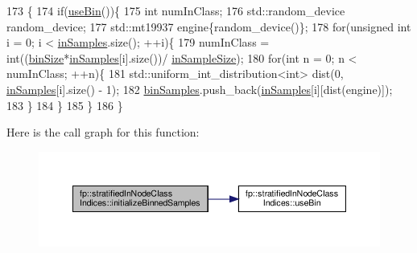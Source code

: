 \begin{DoxyCode}
173                                                  \{
174                 \textcolor{keywordflow}{if}(\hyperlink{classfp_1_1stratifiedInNodeClassIndices_af740a8054cefe977f8f1288fc6b39109}{useBin}())\{
175                     \textcolor{keywordtype}{int} numInClass;
176                     std::random\_device random\_device;
177                     std::mt19937 engine\{random\_device()\};
178                     \textcolor{keywordflow}{for}(\textcolor{keywordtype}{unsigned} \textcolor{keywordtype}{int} i = 0; i < \hyperlink{classfp_1_1stratifiedInNodeClassIndices_a6bfa636c77b48163f5d245959ea753d0}{inSamples}.size(); ++i)\{
179                         numInClass = int((\hyperlink{classfp_1_1stratifiedInNodeClassIndices_aeb008fe5e4d29845a675175590ef2de3}{binSize}*\hyperlink{classfp_1_1stratifiedInNodeClassIndices_a6bfa636c77b48163f5d245959ea753d0}{inSamples}[i].size())/
      \hyperlink{classfp_1_1stratifiedInNodeClassIndices_a2acb617e3212806ae7f994d925bd1468}{inSampleSize});
180                         \textcolor{keywordflow}{for}(\textcolor{keywordtype}{int} n = 0; n < numInClass; ++n)\{
181                             std::uniform\_int\_distribution<int> dist(0, \hyperlink{classfp_1_1stratifiedInNodeClassIndices_a6bfa636c77b48163f5d245959ea753d0}{inSamples}[i].size() - 1);
182                             \hyperlink{classfp_1_1stratifiedInNodeClassIndices_a399e239f3f3175e44ca409be96de0d32}{binSamples}.push\_back(\hyperlink{classfp_1_1stratifiedInNodeClassIndices_a6bfa636c77b48163f5d245959ea753d0}{inSamples}[i][dist(engine)]);
183                         \}
184                     \}
185                 \}
186             \}
\end{DoxyCode}
Here is the call graph for this function\+:\nopagebreak
\begin{figure}[H]
\begin{center}
\leavevmode
\includegraphics[width=350pt]{classfp_1_1stratifiedInNodeClassIndices_ae9907f8984615f91417fb7961e1b582d_cgraph}
\end{center}
\end{figure}
\mbox{\label{classfp_1_1stratifiedInNodeClassIndices_ad6fa9fff888ee939d4681dc065b71815}} 
